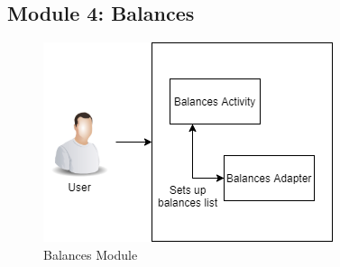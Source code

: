 \documentclass[conference]{IEEEtran}
\begin{document}
\subsection{Module 4: Balances}
    \begin{figure}[H]
        \centerline{\includegraphics[scale=0.5]{img/flowcharts/flowchart-module-balances.png}}
        \caption{Balances Module}
        \label{fig:balances-module-flowchart}
    \end{figure}
\end{document}
